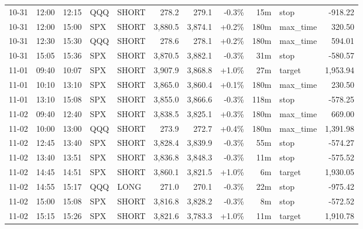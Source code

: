 \documentclass[11pt,a4paper,twoside]{article}
\begin{document}
\begin{center}
\begin{longtable}{>{\color{txtmain}}l l l l l r r r r >{\color{txtmain}}l r}
10-31 & 12:00 & 12:15 & QQQ & SHORT & 278.2 & 279.1 & \textcolor{lossred}{-0.3\%} & 15m & stop & \textcolor{lossred}{-918.22} \\
10-31 & 12:00 & 15:00 & SPX & SHORT & 3,880.5 & 3,874.1 & \textcolor{wingreen}{+0.2\%} & 180m & max\_time & \textcolor{wingreen}{320.50} \\
10-31 & 12:30 & 15:30 & QQQ & SHORT & 278.6 & 278.1 & \textcolor{wingreen}{+0.2\%} & 180m & max\_time & \textcolor{wingreen}{594.01} \\
10-31 & 15:05 & 15:36 & SPX & SHORT & 3,870.5 & 3,882.1 & \textcolor{lossred}{-0.3\%} & 31m & stop & \textcolor{lossred}{-580.57} \\
11-01 & 09:40 & 10:07 & SPX & SHORT & 3,907.9 & 3,868.8 & \textcolor{wingreen}{+1.0\%} & 27m & target & \textcolor{wingreen}{1,953.94} \\
11-01 & 10:10 & 13:10 & SPX & SHORT & 3,865.0 & 3,860.4 & \textcolor{wingreen}{+0.1\%} & 180m & max\_time & \textcolor{wingreen}{230.50} \\
11-01 & 13:10 & 15:08 & SPX & SHORT & 3,855.0 & 3,866.6 & \textcolor{lossred}{-0.3\%} & 118m & stop & \textcolor{lossred}{-578.25} \\
11-02 & 09:40 & 12:40 & SPX & SHORT & 3,838.5 & 3,825.1 & \textcolor{wingreen}{+0.3\%} & 180m & max\_time & \textcolor{wingreen}{669.00} \\
11-02 & 10:00 & 13:00 & QQQ & SHORT & 273.9 & 272.7 & \textcolor{wingreen}{+0.4\%} & 180m & max\_time & \textcolor{wingreen}{1,391.98} \\
11-02 & 12:45 & 13:40 & SPX & SHORT & 3,828.4 & 3,839.9 & \textcolor{lossred}{-0.3\%} & 55m & stop & \textcolor{lossred}{-574.27} \\
11-02 & 13:40 & 13:51 & SPX & SHORT & 3,836.8 & 3,848.3 & \textcolor{lossred}{-0.3\%} & 11m & stop & \textcolor{lossred}{-575.52} \\
11-02 & 14:45 & 14:51 & SPX & SHORT & 3,860.1 & 3,821.5 & \textcolor{wingreen}{+1.0\%} & 6m & target & \textcolor{wingreen}{1,930.05} \\
11-02 & 14:55 & 15:17 & QQQ & LONG & 271.0 & 270.1 & \textcolor{lossred}{-0.3\%} & 22m & stop & \textcolor{lossred}{-975.42} \\
11-02 & 15:00 & 15:08 & SPX & SHORT & 3,816.8 & 3,828.2 & \textcolor{lossred}{-0.3\%} & 8m & stop & \textcolor{lossred}{-572.52} \\
11-02 & 15:15 & 15:26 & SPX & SHORT & 3,821.6 & 3,783.3 & \textcolor{wingreen}{+1.0\%} & 11m & target & \textcolor{wingreen}{1,910.78} \\

\end{longtable}
\end{center}
\end{document}

